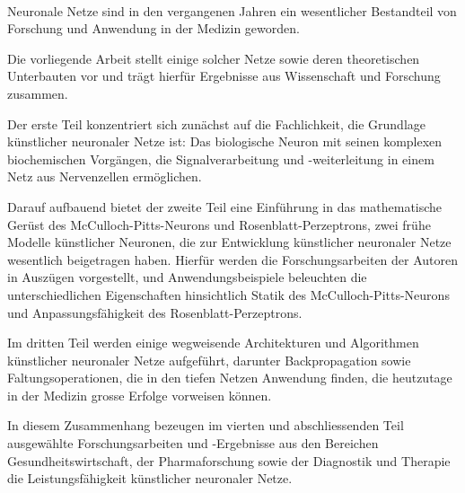 \kurzfassung

\paragraph*{}

Neuronale Netze sind in den vergangenen Jahren ein wesentlicher Bestandteil von Forschung und Anwendung in der Medizin geworden.

Die vorliegende Arbeit stellt einige solcher Netze sowie deren theoretischen Unterbauten vor und trägt hierfür Ergebnisse aus Wissenschaft und Forschung zusammen.

Der erste Teil konzentriert sich zunächst auf die Fachlichkeit, die Grundlage künstlicher neuronaler Netze ist: Das biologische Neuron mit seinen komplexen biochemischen Vorgängen, die Signalverarbeitung und -weiterleitung in einem Netz aus Nervenzellen ermöglichen.

Darauf aufbauend bietet der zweite Teil eine Einführung in das mathematische Gerüst des McCulloch-Pitts-Neurons und Rosenblatt-Perzeptrons, zwei frühe Modelle künstlicher Neuronen, die zur Entwicklung künstlicher neuronaler Netze wesentlich beigetragen haben.
Hierfür werden die Forschungsarbeiten der Autoren in Auszügen vorgestellt, und Anwendungsbeispiele beleuchten die unterschiedlichen Eigenschaften hinsichtlich Statik des McCulloch-Pitts-Neurons und Anpassungsfähigkeit des Rosenblatt-Perzeptrons.

Im dritten Teil werden einige wegweisende Architekturen und Algorithmen künstlicher neuronaler Netze aufgeführt, darunter Backpropagation sowie Faltungsoperationen, die in den tiefen Netzen Anwendung finden, die heutzutage in der Medizin grosse Erfolge vorweisen können.

In diesem Zusammenhang bezeugen im vierten und abschliessenden Teil ausgewählte Forschungsarbeiten und -Ergebnisse aus den Bereichen Gesundheitswirtschaft, der Pharmaforschung sowie der Diagnostik und Therapie die Leistungsfähigkeit künstlicher neuronaler Netze.
